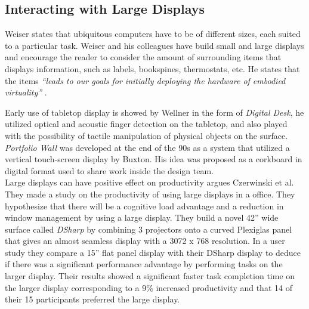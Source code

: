 \subsection{Interacting with Large Displays}
Weiser states that ubiquitous computers have to be of different sizes, each suited to a particular task. Weiser and his colleagues have build small and large displays and encourage the reader to consider the amount of surrounding items that displays information, such as labels, bookspines, thermostats, etc. He states that the items \emph{``leads to our goals for initially deploying the hardware of embodied virtuality''} \cite{Weiser:1991}.

Early use of tabletop display is showed by Wellner in the form of \emph{Digital Desk}, he utilized optical and acoustic finger detection on the tabletop, and also played with the possibility of tactile manipulation of physical objects on the surface.\cite{Wellner:1993} \emph{Portfolio Wall} was developed at the end of the 90s as a system that utilized a vertical touch-screen display by Buxton\cite{Buxton:2000}. His idea was proposed as a corkboard in digital format used to share work inside the design team.\\

Large displays can have positive effect on productivity argues Czerwinski et al. \cite{Czerwinski:2003} They made a study on the productivity of using large displays in a office. They hypothesize that there will be a cognitive load advantage and a reduction in window management by using a large display. They build a novel 42'' wide surface called \emph{DSharp} by combining 3 projectors onto a curved Plexiglas panel that gives an almost seamless display with a 3072 x 768 resolution. In a user study they compare a 15'' flat panel display with their DSharp display to deduce if there was a significant performance advantage by performing tasks on the larger display. Their results showed a significant faster task completion time on the larger display corresponding to a 9\% increased productivity and that 14 of their 15 participants preferred the large display.

